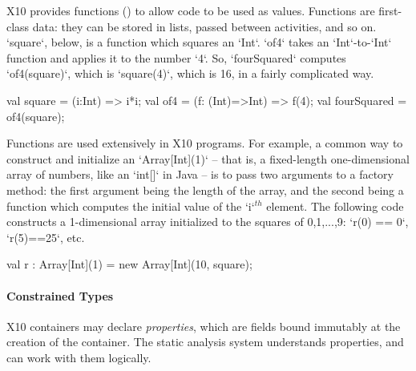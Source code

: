 X10 provides functions () to allow code to be used
as values.  Functions are first-class data: they can be stored in lists,
passed between activities, and so on.  \xcd`square`, below, is a function
which squares an \xcd`Int`.  \xcd`of4` takes an \xcd`Int`-to-\xcd`Int`
function and applies it to the number \xcd`4`.  So, \xcd`fourSquared` computes
\xcd`of4(square)`, which is \xcd`square(4)`, which is 16, in a fairly
complicated way.
\begin{xten}
  val square = (i:Int) => i*i;
  val of4 = (f: (Int)=>Int) => f(4);
  val fourSquared = of4(square);
\end{xten}



Functions are used extensively in X10
programs.  For example, a common way to construct and initialize an \xcd`Array[Int](1)` --
that is, a fixed-length one-dimensional array of numbers, like an \xcd`int[]` in Java -- is to
pass two arguments to a factory method: the first argument being the length of
the array, and the second being a function which computes the initial value of
the \xcd`i`{$^{th}$} element.  The following code constructs a 1-dimensional
array 
initialized to the squares of 0,1,...,9: \xcd`r(0) == 0`, \xcd`r(5)==25`, etc. 
\begin{xten}
  val r : Array[Int](1) = new Array[Int](10, square);
\end{xten}








\paragraph{Constrained Types}

X10 containers may declare {\em properties}, which are fields bound immutably
at the creation of the container.  The static analysis system understands
properties, and can work with them logically.   


